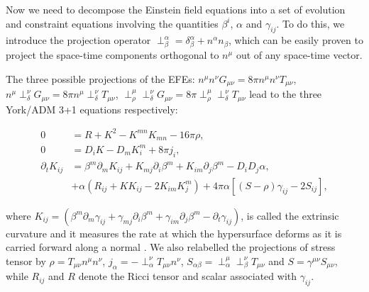 \documentclass{ut-thesis}
\begin{document}
Now we need to decompose the Einstein field equations into a set of evolution and constraint equations involving the quantities $\beta^i$, $\alpha$ and $\gamma_{ij}$. To do this, we introduce the projection operator $\perp^{\alpha}_{\beta} = \delta^{\alpha}_{\beta} + n^{\alpha} n_{\beta}$, which can be easily proven to project the space-time components orthogonal to $n^{\mu}$ out of any space-time vector.

The three possible projections of the EFEs: $n^{\mu} n^{\nu} G_{\mu\nu} = 8\pi n^{\mu} n^{\nu} T_{\mu\nu}$, $n^{\mu}\perp^{\nu}_{\delta}G_{\mu\nu} = 8\pi n^{\mu} \perp^{\nu}_{\delta} T_{\mu\nu}$, $\perp^{\mu}_{\rho} \perp^{\nu}_{\delta} G_{\mu\nu} = 8\pi \perp^{\mu}_{\rho} \perp^{\nu}_{\delta} T_{\mu\nu}$ lead to the three York/ADM 3+1 equations respectively:

\begin{equation}
\label{eq:5}
\begin{split}
0 &= R + K^{2} - K^{mn}K_{mn} -16\pi\rho, \\
0 &= D_iK - D_mK^m_i + 8\pi j_i, \\
\partial_t K_{ij} &= \beta^m\partial_mK_{ij} + K_{mj}\partial_i\beta^m + K_{im}\partial_j\beta^m - D_iD_j\alpha, \\ 
&+ \alpha(R_{ij}+KK_{ij}-2K_{im}K^m_{j})+4\pi\alpha[(S-\rho)\gamma_{ij}-2S_{ij}],
\end{split} 
\end{equation}

where $K_{ij} = (\beta^m\partial_m\gamma_{ij} + \gamma_{mj}\partial_{i}\beta^{m} + \gamma_{im}\partial_j\beta^{m}-\partial_{t}\gamma_{ij})$, is called the extrinsic curvature and it measures
the rate at which the hypersurface deforms as it is carried forward along a normal \cite{baumgarte2010numerical}. We also relabelled the projections of stress tensor by $\rho = T_{\mu\nu} n^{\mu} n^{\nu}$, $j_{\alpha}= -\perp^{\nu}_{\alpha} T_{\mu\nu} n^{\nu}$, $S_{\alpha\beta} = \perp^{\mu}_{\alpha} \perp^{\nu}_{\beta} T_{\mu\nu}$ and $S=\gamma^{\mu\nu} S_{\mu\nu}$, while $R_{ij}$ and $R$ denote the Ricci tensor and scalar associated with $\gamma_{ij}$.
\end{document}
